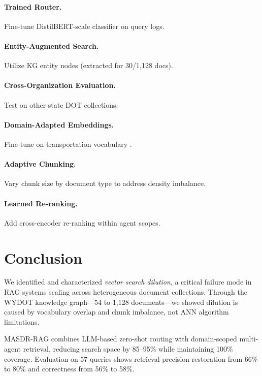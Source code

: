 \documentclass[11pt,a4paper]{article}
\newcommand{\systemname}{\textsc{MASDR-RAG}}
\newcommand{\numDocs}{1{,}128}
\begin{document}
\paragraph{Trained Router.} Fine-tune DistilBERT-scale classifier on query logs.
\paragraph{Entity-Augmented Search.} Utilize KG entity nodes (extracted for 30/\numDocs{} docs).
\paragraph{Cross-Organization Evaluation.} Test on other state DOT collections.
\paragraph{Domain-Adapted Embeddings.} Fine-tune on transportation vocabulary \cite{wang2024e5mistral}.
\paragraph{Adaptive Chunking.} Vary chunk size by document type to address density imbalance.
\paragraph{Learned Re-ranking.} Add cross-encoder re-ranking \cite{nogueira2020reranking} within agent scopes.


\section{Conclusion}

We identified and characterized \textit{vector search dilution}, a critical failure mode in RAG systems scaling across heterogeneous document collections. Through the WYDOT knowledge graph---54 to \numDocs{} documents---we showed dilution is caused by vocabulary overlap and chunk imbalance, not ANN algorithm limitations.

\systemname{} combines LLM-based zero-shot routing with domain-scoped multi-agent retrieval, reducing search space by 85--95\% while maintaining 100\% coverage. Evaluation on 57 queries shows retrieval precision restoration from 66\% to 80\% and correctness from 56\% to 58\%.
\end{document}
